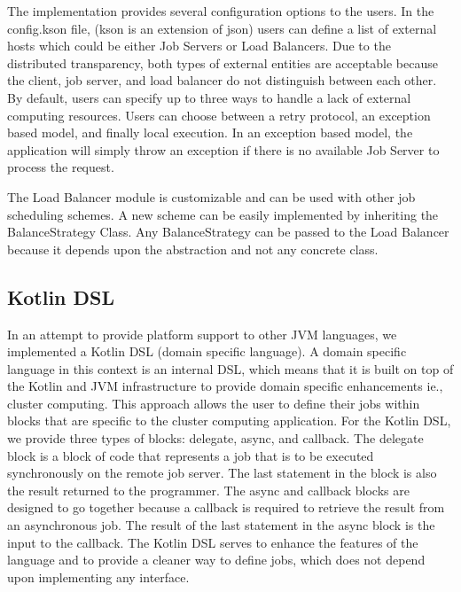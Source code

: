 The implementation provides several configuration options to the users. In the config.kson file, (kson is an extension of json) users can define a list of external hosts which could be either Job Servers or Load Balancers. Due to the distributed transparency, both types of external entities are acceptable because the client, job server, and load balancer do not distinguish between each other. By default, users can specify up to three ways to handle
a lack of external computing resources. Users can choose between a retry protocol, an exception based model, and finally local execution. In an exception based model, the application will simply throw an exception if there is no available Job Server to process the request.

The Load Balancer module is customizable and can be used with other job scheduling schemes. A new scheme can be easily implemented by inheriting the BalanceStrategy Class. Any BalanceStrategy can be passed to the Load Balancer because it depends upon the abstraction and not any concrete class.


\subsection{Kotlin DSL}\label{subsec:kotlinDsl}

In an attempt to provide platform support to other JVM languages, we
implemented a Kotlin DSL (domain specific language).
A domain specific language in this context is an internal DSL, which
means that it is built on top of the Kotlin and JVM infrastructure
to provide domain specific enhancements ie., cluster computing.
This approach allows the user to define their jobs within blocks
that are specific to the cluster computing application.
For the Kotlin DSL, we provide three types of blocks:
delegate, async, and callback.
The delegate block is a block of code that represents a job
that is to be executed synchronously on the remote job server.
The last statement in the block is also the result returned to the
programmer.
The async and callback blocks are designed to go together because
a callback is required to retrieve the result from an asynchronous
job.
The result of the last statement in the async block is the input
to the callback.
The Kotlin DSL serves to enhance the features of the language and to
provide a cleaner way to define jobs, which does not depend upon
implementing any interface.
